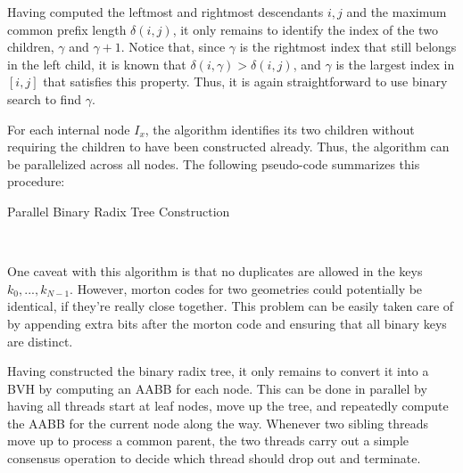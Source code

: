 Having computed the leftmost and rightmost descendants $i,j$ and the maximum common prefix length $\delta(i,j)$, it only remains to identify the index of the two children, $\gamma$ and $\gamma+1$. Notice that, since $\gamma$ is the rightmost index that still belongs in the left child, it is known that $\delta(i,\gamma)>\delta(i,j)$, and $\gamma$ is the largest index in $[i,j]$ that satisfies this property. Thus, it is again straightforward to use binary search to find $\gamma$. 

For each internal node $I_x$, the algorithm identifies its two children without requiring the children to have been constructed already. Thus, the algorithm can be parallelized across all nodes. The following pseudo-code summarizes this procedure:

\begin{algorithm}[H]
    \label{algo construct radix tree}
    \caption{Parallel Binary Radix Tree Construction}
\end{algorithm} 

~ 

One caveat with this algorithm is that no duplicates are allowed in the keys $k_0,...,k_{N-1}$. However, morton codes for two geometries could potentially be identical, if they're really close together. This problem can be easily taken care of by appending extra bits after the morton code and ensuring that all binary keys are distinct.

Having constructed the binary radix tree, it only remains to convert it into a BVH by computing an AABB for each node. This can be done in parallel by having all threads start at leaf nodes, move up the tree, and repeatedly compute the AABB for the current node along the way. Whenever two sibling threads move up to process a common parent, the two threads carry out a simple consensus operation to decide which thread should drop out and terminate. 

